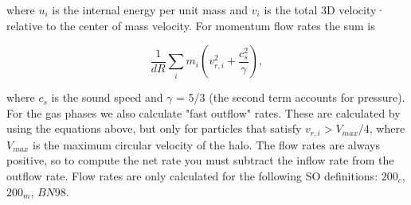 where $u_i$ is the internal energy per unit mass and $v_i$ is the total 3D velocity·
relative to the center of mass velocity. For momentum flow rates the sum is

\begin{equation}
    \frac{1}{dR} \sum_{i} m_i \left(v_{r,i}^2 + \frac{c_s^2}{\gamma}\right),
\end{equation}

where $c_s$ is the sound speed and $\gamma$ = 5/3 (the second term accounts for pressure). For the gas phases we also calculate "fast outflow" rates. These are calculated by using the equations above, but only for particles that satisfy $v_{r,i} > V_{max} / 4$, where $V_{max}$ is the maximum circular velocity of the halo. The flow rates are always positive, so to compute the net rate you must subtract the inflow rate from the outflow rate. Flow rates are only calculated for the
following SO definitions: $200_{c}$, $200_{m}$, $BN98$.
